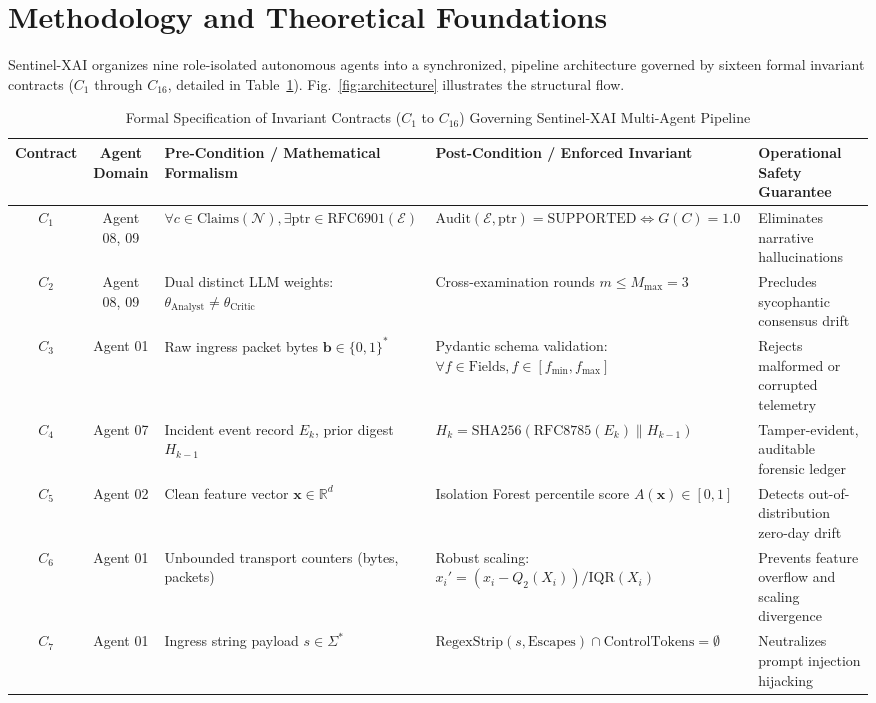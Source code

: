 \documentclass{ieeeaccess}
\begin{document}
\section{Methodology and Theoretical Foundations}
\label{sec:methodology}
Sentinel-XAI organizes nine role-isolated autonomous agents into a synchronized, pipeline architecture governed by sixteen formal invariant contracts ($C_1$ through $C_{16}$, detailed in Table~\ref{tab:contracts}). Fig.~\ref{fig:architecture} illustrates the structural flow.

\begin{table}[t]
\centering
\caption{Formal Specification of Invariant Contracts ($C_1$ to $C_{16}$) Governing Sentinel-XAI Multi-Agent Pipeline}
\label{tab:contracts}
\begin{tabular}{cclll}
\toprule
\textbf{Contract} & \textbf{Agent Domain} & \textbf{Pre-Condition / Mathematical Formalism} & \textbf{Post-Condition / Enforced Invariant} & \textbf{Operational Safety Guarantee} \\
\midrule
$C_1$ & Agent 08, 09 & $\forall c \in \text{Claims}(\mathcal{N}), \exists \text{ptr} \in \text{RFC6901}(\mathcal{E})$ & $\text{Audit}(\mathcal{E}, \text{ptr}) = \text{SUPPORTED} \iff G(C) = 1.0$ & Eliminates narrative hallucinations \\
$C_2$ & Agent 08, 09 & Dual distinct LLM weights: $\theta_{\text{Analyst}} \ne \theta_{\text{Critic}}$ & Cross-examination rounds $m \le M_{\max}=3$ & Precludes sycophantic consensus drift \\
$C_3$ & Agent 01 & Raw ingress packet bytes $\mathbf{b} \in \{0, 1\}^*$ & Pydantic schema validation: $\forall f \in \text{Fields}, f \in [f_{\min}, f_{\max}]$ & Rejects malformed or corrupted telemetry \\
$C_4$ & Agent 07 & Incident event record $E_k$, prior digest $H_{k-1}$ & $H_k = \text{SHA256}(\text{RFC8785}(E_k) \parallel H_{k-1})$ & Tamper-evident, auditable forensic ledger \\
$C_5$ & Agent 02 & Clean feature vector $\mathbf{x} \in \mathbb{R}^d$ & Isolation Forest percentile score $A(\mathbf{x}) \in [0, 1]$ & Detects out-of-distribution zero-day drift \\
$C_6$ & Agent 01 & Unbounded transport counters (bytes, packets) & Robust scaling: $x_i' = (x_i - Q_2(X_i)) / \text{IQR}(X_i)$ & Prevents feature overflow and scaling divergence \\
$C_7$ & Agent 01 & Ingress string payload $s \in \Sigma^*$ & $\text{RegexStrip}(s, \text{Escapes}) \cap \text{ControlTokens} = \emptyset$ & Neutralizes prompt injection hijacking \\

\end{tabular}
\end{table}
\end{document}

